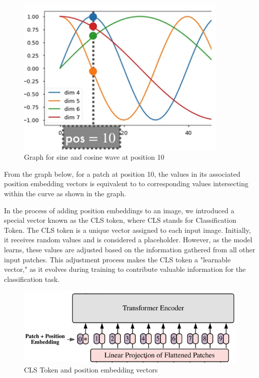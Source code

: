 \begin{figure}[htbp]
    \centering
    \includegraphics[width=4in]{img/pos 10.png}
    \caption{{Graph for sine and cosine wave  at position 10}}
\end{figure}
\noindent From the graph below, for a patch at position 10, the values in its associated position embedding vectors is equivalent to to corresponding values intersecting within the curve as shown in the graph.

\noindent In the process of adding position embeddings to an image, we introduced a special vector known as the CLS token, where CLS stands for Classification Token. The CLS token is a unique vector assigned to each input image. Initially, it receives random values and is considered a placeholder. However, as the model learns, these values are adjusted based on the information gathered from all other input patches. This adjustment process makes the CLS token a "learnable vector," as it evolves during training to contribute valuable information for the classification task.\\

\begin{figure}[htbp]
    \centering
    \includegraphics[width=5in]{img/CLS token.png}
    \caption{{CLS Token and position embedding vectors}}
\end{figure}

